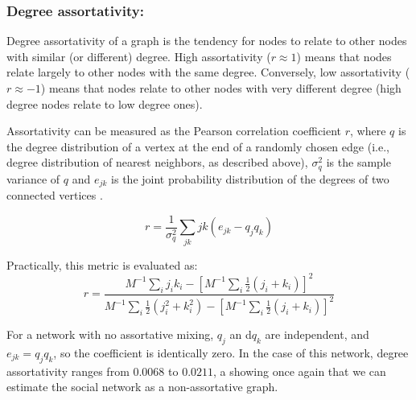 \documentclass[12pt]{article}
\begin{document}
\subsubsection*{Degree assortativity:}


Degree assortativity of a graph is the tendency for nodes to relate to other nodes with similar (or different) degree. High assortativity (\(r \approx 1\)) means that nodes relate largely to other nodes with the same degree. Conversely, low assortativity (\(r \approx -1\)) means that nodes relate to other nodes with very different degree (high degree nodes relate to low degree ones). 

Assortativity can be measured as the Pearson correlation coefficient \(r\), where \(q\) is the degree distribution of a vertex at the end of a randomly chosen edge (i.e., degree distribution of nearest neighbors, as described above), \(\sigma^2_q\) is the sample variance of \(q\) and \(e_{jk}\) is the joint probability distribution of the degrees of two connected vertices \cite{2}.

\begin{equation}
r = \frac{1}{\sigma^2_q} \sum_{jk} jk(e_{jk} - q_{j}q_{k})
\label{eq:rk}
\end{equation}

 Practically, this metric is evaluated as:
\begin{equation}
r = \frac{M^{-1} \sum_i j_i k_i - [M^{-1} \sum_i \frac{1}{2} (j_i + k_i)]^2}{M^{-1} \sum_i\frac{1}{2} (j_i^2 + k_i^2) - [M^{-1} \sum_i \frac{1}{2} (j_i + k_i)]^2}
\end{equation}

For a network with no assortative mixing, \(q_j\) an d\(q_k\) are independent, and \(e_{jk} = q_{j}q_{k}\), so the coefficient is identically zero. In the case of this network, degree assortativity ranges from \( 0.0068 \) to \(0.0211\), a showing once again that we can estimate the social network as a non-assortative graph.
\end{document}
